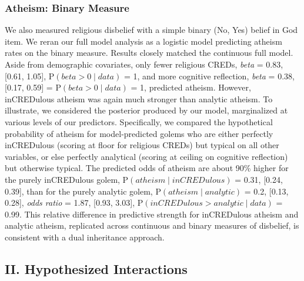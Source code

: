 \documentclass[english,man,mask]{article}
\begin{document}
\hypertarget{atheism-binary-measure}{%
\subsubsection{Atheism: Binary Measure}\label{atheism-binary-measure}}

We also measured religious disbelief with a simple binary (No, Yes) belief in God item. We reran our full model analysis as a logistic model predicting atheism rates on the binary measure. Results closely matched the continuous full model. Aside from demographic covariates, only fewer religious CREDs, \emph{beta} = 0.83, {[}0.61, 1.05{]}, \(\mathrm{P}(beta > 0 \mid data)\) = 1, and more cognitive reflection, \emph{beta} = 0.38, {[}0.17, 0.59{]} = \(\mathrm{P}(beta > 0 \mid data)\) = 1, predicted atheism. However, inCREDulous atheism was again much stronger than analytic atheism. To illustrate, we considered the posterior produced by our model, marginalized at various levels of our predictors. Specifically, we compared the hypothetical probability of atheism for model-predicted golems who are either perfectly inCREDulous (scoring at floor for religious CREDs) but typical on all other variables, or else perfectly analytical (scoring at ceiling on cognitive reflection) but otherwise typical. The predicted odds of atheism are about 90\% higher for the purely inCREDulous golem, \(\mathrm{P}(atheism \mid inCREDulous)\) = 0.31, {[}0.24, 0.39{]}, than for the purely analytic golem, \(\mathrm{P}(atheism \mid analytic)\) = 0.2, {[}0.13, 0.28{]}, \emph{odds ratio} = 1.87, {[}0.93, 3.03{]}, \(\mathrm{P}(inCREDulous > analytic \mid data)\) = 0.99. This relative difference in predictive strength for inCREDulous atheism and analytic atheism, replicated across continuous and binary measures of disbelief, is consistent with a dual inheritance approach.

\hypertarget{ii.-hypothesized-interactions}{%
\subsection{II. Hypothesized Interactions}\label{ii.-hypothesized-interactions}}
\end{document}
